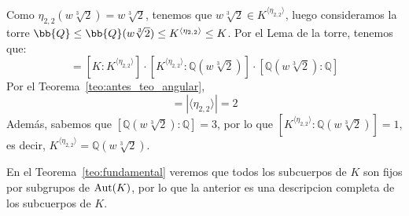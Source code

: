 \begin{ejemplo}
\begin{itemize}
        Como $\eta_{2,2}(w\sqrt[3]{2}) = w\sqrt[3]{2}$, tenemos que $w\sqrt[3]{2}\in K^{\langle \eta_{2,2} \rangle }$, luego consideramos la torre $\bb{Q}\leq \bb{Q}(w\sqrt[3]{2})\leq K^{\langle \eta_{2,2} \rangle }\leq K$. Por el Lema de la torre, tenemos que:
        \begin{equation*}
            [K:\mathbb{Q}] = [K:K^{\langle \eta_{2,2} \rangle }]\cdot [K^{\langle \eta_{2,2} \rangle }:\mathbb{Q}(w\sqrt[3]{2})]\cdot [\mathbb{Q}(w\sqrt[3]{2}):\mathbb{Q}]
        \end{equation*}
        Por el Teorema~\ref{teo:antes_teo_angular},
        \begin{equation*}
            [K:K^{\langle \eta_{2,2} \rangle }] = |\langle \eta_{2,2} \rangle | = 2
        \end{equation*}
        Además, sabemos que $[\mathbb{Q}(w\sqrt[3]{2}):\mathbb{Q}] = 3$, por lo que $[K^{\langle \eta_{2,2} \rangle }:\mathbb{Q}(w\sqrt[3]{2})] = 1$, es decir, $K^{\langle \eta_{2,2} \rangle } = \mathbb{Q}(w\sqrt[3]{2})$.
    \end{itemize}

    En el Teorema~\ref{teo:fundamental} veremos que todos los subcuerpos de $K$ son fijos por subgrupos de $\operatorname{Aut}(K)$, por lo que la anterior es una descripcion completa de los subcuerpos de $K$.
\end{ejemplo}


